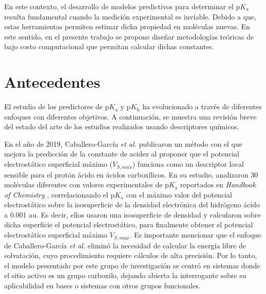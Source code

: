 \documentclass[12pt]{article}
\begin{document}
	En este contexto, el desarrollo de modelos predictivos para determinar el $\mathrm{p}K_{\mathrm{a}}$ resulta fundamental cuando la medici\'{o}n experimental es inviable. Debido a que, estas herramientas permiten estimar dicha propiedad en mol\'{e}culas nuevas. En este sentido, en el presente trabajo se propone diseñar metodolog\'{i}as te\'{o}ricas de bajo costo computacional que permitan calcular dichas constantes.
	
	\clearpage
	
	

	
	\section{Antecedentes}
	
	El estudio de los predictores de $\mathrm{p}K_{\mathrm{a}}$ y $\mathrm{p}K_{\mathrm{b}}$ 
	 ha evolucionado a trav\'{e}s de diferentes enfoques con diferentes objetivos. A continuaci\'{o}n,  se muestra una revisi\'{o}n breve del estado del arte de los estudios realizados usando descriptores qu\'{i}micos.
	
	
	En el año de 2019, Caballero-Garc\'{i}a \textit{et al.} \cite{Caballero-Garcia2019} publicaron un m\'{e}todo con el que mejora la predicci\'{o}n de la constante de acidez al proponer que el potencial electrost\'{a}tico superficial m\'{a}ximo ($V_{S,max}$) funciona como un descriptor local sensible para el prot\'{o}n \'{a}cido en \'{a}cidos carbox\'{i}licos. En su estudio, analizaron 30 mol\'{e}culas diferentes con valores experimentales de $\mathrm{p}K_{\mathrm{a}}$ reportados en \textit{Handbook of Chemistry} \cite{Lange2005}, correlacionando el $\mathrm{p}K_{\mathrm{a}}$ con el m\'{a}ximo valor del potencial electrost\'{a}tico sobre la
	isosuperficie de la densidad electr\'{o}nica del hidr\'{o}geno \'{a}cido a 0.001 au.  Es decir, ellos usaron una isosuperficie de densidad y calcularon sobre dicha superficie el potencial electrost\'{a}tico, para finalmente obtener el potencial electrost\'{a}tico superficial m\'{a}ximo $V_{S,max}$. Es importante mencionar que el enfoque de Caballero-Garc\'{i}a \textit{et al.} elimin\'{o} la necesidad de calcular la energ\'{i}a libre de solvataci\'{o}n, cuyo procedimiento requiere c\'{a}lculos de alta precisi\'{o}n. Por lo tanto, el modelo presentado por este grupo de investigaci\'{o}n se centr\'{o} en sistemas donde el sitio activo es un grupo carboxilo, dejando abierta la interrogante sobre su aplicabilidad en bases o sistemas con otros grupos funcionales.
	
\end{document}
